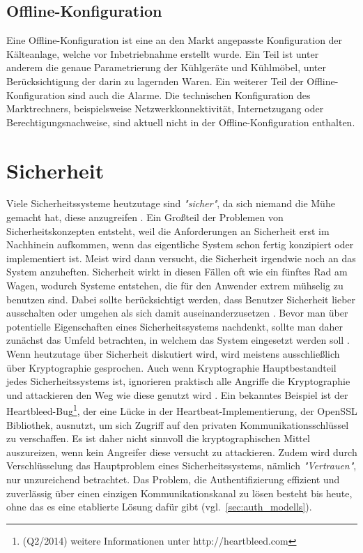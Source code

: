 \documentclass[11pt,a4paper]{report}
\begin{document}
\subsection{Offline-Konfiguration} 

Eine Offline-Konfiguration ist eine an den Markt angepasste Konfiguration der Kälteanlage, welche vor Inbetriebnahme erstellt wurde. Ein Teil ist unter anderem die genaue Parametrierung der Kühlgeräte und Kühlmöbel, unter Berücksichtigung der darin zu lagernden Waren. Ein weiterer Teil der Offline-Konfiguration sind auch die Alarme. Die technischen Konfiguration des Marktrechners, beispielsweise Netzwerkkonnektivität, Internetzugang oder Berechtigungsnachweise, sind aktuell nicht in der Offline-Konfiguration enthalten.

\section{Sicherheit} \label{sec:security_conzept}

Viele Sicherheitssysteme heutzutage sind \textit{"sicher"}, da sich niemand die Mühe gemacht hat, diese anzugreifen \cite[s.~0]{gutmann}. Ein Großteil der Problemen von Sicherheitskonzepten entsteht, weil die Anforderungen an Sicherheit erst im Nachhinein aufkommen, wenn das eigentliche System schon fertig konzipiert oder implementiert ist. Meist wird dann versucht, die Sicherheit irgendwie noch an das System anzuheften. Sicherheit wirkt in diesen Fällen oft wie ein fünftes Rad am Wagen, wodurch Systeme entstehen, die für den Anwender extrem mühselig zu benutzen sind. Dabei sollte berücksichtigt werden, dass Benutzer Sicherheit lieber ausschalten oder umgehen als sich damit auseinanderzusetzen \cite[s.~5]{gutmann}. Bevor man über potentielle Eigenschaften eines Sicherheitssystems nachdenkt, sollte man daher zunächst das Umfeld betrachten, in welchem das System eingesetzt werden soll \cite[s.~4]{gutmann}. Wenn heutzutage über Sicherheit diskutiert wird, wird meistens ausschließlich über Kryptographie gesprochen. Auch wenn Kryptographie Hauptbestandteil jedes Sicherheitssystems ist, ignorieren praktisch alle Angriffe die Kryptographie und attackieren den Weg wie diese genutzt wird \cite[s.~1]{gutmann}. Ein bekanntes Beispiel ist der Heartbleed-Bug\footnote{(Q2/2014) weitere Informationen unter http://heartbleed.com}, der eine Lücke in der Heartbeat-Implementierung, der OpenSSL Bibliothek, ausnutzt, um sich Zugriff auf den privaten Kommunikationsschlüssel zu verschaffen. Es ist daher nicht sinnvoll die kryptographischen Mittel auszureizen, wenn kein Angreifer diese versucht zu attackieren. Zudem wird durch Verschlüsselung das Hauptproblem eines Sicherheitssystems, nämlich \textit{"Vertrauen"}, nur unzureichend betrachtet. Das Problem, die Authentifizierung effizient und zuverlässig über einen einzigen Kommunikationskanal zu lösen besteht bis heute, ohne das es eine etablierte Lösung dafür gibt (vgl.~\ref{sec:auth_modells}). 
\end{document}
